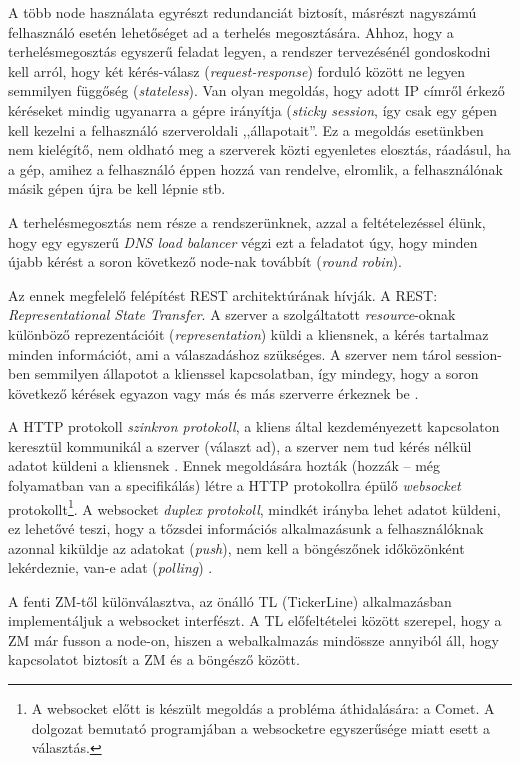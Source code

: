 \documentclass[12pt, a4paper, oneside]{book}
\begin{document}
A több node használata egyrészt redundanciát biztosít, másrészt nagyszámú
felhasználó esetén lehetőséget ad a terhelés megosztására. Ahhoz, hogy a
terhelésmegosztás egyszerű feladat legyen, a rendszer tervezésénél gondoskodni
kell arról, hogy két kérés-válasz (\emph{request-response}) forduló között ne
legyen semmilyen függőség (\emph{stateless}). Van olyan megoldás, hogy adott IP
címről érkező kéréseket mindig ugyanarra a gépre irányítja (\emph{sticky
session}, így csak egy gépen kell kezelni a felhasználó szerveroldali
,,állapotait''. Ez a megoldás esetünkben nem kielégítő, nem oldható meg a
szerverek közti egyenletes elosztás, ráadásul, ha a gép, amihez a felhasználó
éppen hozzá van rendelve, elromlik, a felhasználónak másik gépen újra be kell
lépnie stb.

A terhelésmegosztás nem része a rendszerünknek, azzal a feltételezéssel élünk,
hogy egy egyszerű \emph{DNS load balancer} végzi ezt a feladatot úgy, hogy
minden újabb kérést a soron következő node-nak továbbít (\emph{round robin}). 

Az ennek megfelelő felépítést REST architektúrának hívják. A REST:
\emph{Representational State Transfer}. A szerver a szolgáltatott
\emph{resource}-oknak különböző reprezentációit (\emph{representation})
küldi a kliensnek, a kérés tartalmaz minden információt, ami a válaszadáshoz
szükséges. A szerver nem tárol session-ben semmilyen állapotot a klienssel
kapcsolatban, így mindegy, hogy a soron következő kérések egyazon vagy más és
más szerverre érkeznek be \citep{Fielding}.

A HTTP protokoll \emph{szinkron protokoll}, a kliens által kezdeményezett
kapcsolaton keresztül kommunikál a szerver (választ ad), a szerver nem tud
kérés nélkül adatot küldeni a kliensnek \citep{HTTPSpec}. Ennek megoldására hozták (hozzák --
még folyamatban van a specifikálás) létre a HTTP protokollra épülő
\emph{websocket} protokollt\footnote{A websocket előtt is készült megoldás a
probléma áthidalására: a Comet. A dolgozat bemutató programjában a websocketre
egyszerűsége miatt esett a választás.}.  A websocket \emph{duplex protokoll},
mindkét irányba lehet adatot küldeni, ez lehetővé teszi, hogy a tőzsdei
információs alkalmazásunk a felhasználóknak azonnal kiküldje az adatokat
(\emph{push}), nem kell a böngészőnek időközönként lekérdeznie, van-e adat
(\emph{polling}) \citep{WebsocketSpec}.

A fenti ZM-től különválasztva, az önálló TL (TickerLine) alkalmazásban 
implementáljuk a websocket interfészt. A TL előfeltételei között szerepel, hogy
a ZM már fusson a node-on, hiszen a webalkalmazás mindössze annyiból áll, hogy
kapcsolatot biztosít a ZM és a böngésző között.
\end{document}
